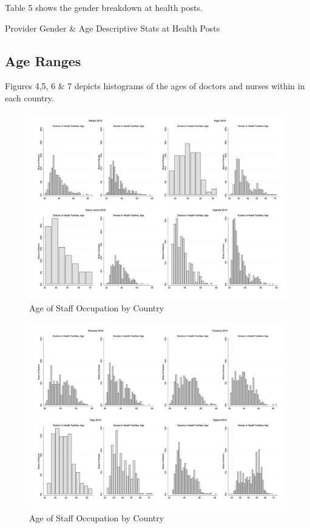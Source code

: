 \documentclass{article}                 %
\begin{document}
	Table 5 shows the gender breakdown at health posts.
		
			\begin{table}[H]
				\centering
				\caption{Provider Gender \& Age Descriptive Stats at Health Posts}
				
			\end{table}
		
	\subsection{Age Ranges}		
	
	Figures 4,5, 6 \& 7 depicts histograms of the ages of doctors and nurses within in each country.
	
			\begin{figure}[H] 
				\centering
				\caption{Age of Staff Occupation  by Country} 
				\includegraphics[width=\textwidth]{"../Output/Final/Hist_age_1"}
			\end{figure}
		
			\begin{figure}[H] 
				\centering
				\caption{Age of Staff Occupation  by Country} 
				\includegraphics[width=\textwidth]{"../Output/Final/Hist_age_2"}
			\end{figure}
		
\end{document}
